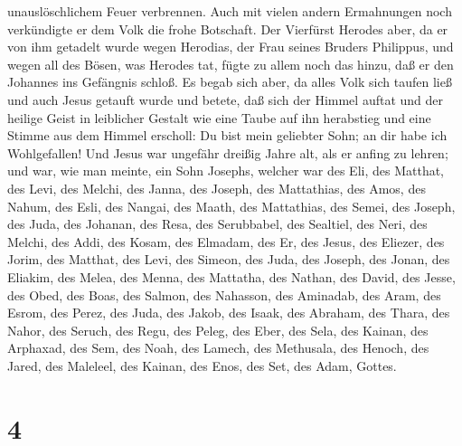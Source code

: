 unauslöschlichem Feuer verbrennen.  Auch mit vielen
andern Ermahnungen noch verkündigte er dem Volk die frohe Botschaft.
 Der Vierfürst Herodes aber, da er von ihm getadelt wurde
wegen Herodias, der Frau seines Bruders Philippus, und wegen all des
Bösen, was Herodes tat,  fügte zu allem noch das hinzu,
daß er den Johannes ins Gefängnis schloß.  Es begab sich
aber, da alles Volk sich taufen ließ und auch Jesus getauft wurde und
betete, daß sich der Himmel auftat  und der heilige Geist
in leiblicher Gestalt wie eine Taube auf ihn herabstieg und eine Stimme
aus dem Himmel erscholl: Du bist mein geliebter Sohn; an dir habe ich
Wohlgefallen!  Und Jesus war ungefähr dreißig Jahre alt,
als er anfing zu lehren; und war, wie man meinte, ein Sohn Josephs,
 welcher war des Eli, des Matthat, des Levi, des Melchi,
des Janna, des Joseph,  des Mattathias, des Amos, des
Nahum, des Esli, des Nangai,  des Maath, des Mattathias,
des Semei, des Joseph, des Juda,  des Johanan, des Resa,
des Serubbabel, des Sealtiel, des Neri,  des Melchi, des
Addi, des Kosam, des Elmadam, des Er,  des Jesus, des
Eliezer, des Jorim, des Matthat, des Levi,  des Simeon,
des Juda, des Joseph, des Jonan, des Eliakim,  des Melea,
des Menna, des Mattatha, des Nathan, des David,  des
Jesse, des Obed, des Boas, des Salmon, des Nahasson,  des
Aminadab, des Aram, des Esrom, des Perez, des Juda,  des
Jakob, des Isaak, des Abraham, des Thara, des Nahor,  des
Seruch, des Regu, des Peleg, des Eber, des Sela,  des
Kainan, des Arphaxad, des Sem, des Noah, des Lamech,  des
Methusala, des Henoch, des Jared, des Maleleel, des Kainan,
 des Enos, des Set, des Adam, Gottes.

\hypertarget{section-3}{%
\section{4}\label{section-3}}

